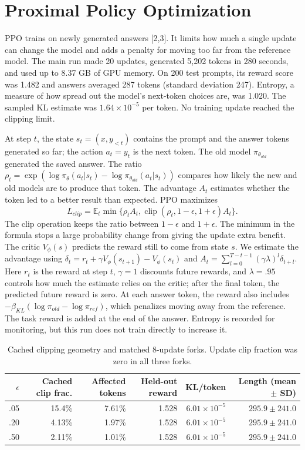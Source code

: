 \documentclass[10pt]{article}
\begin{document}
\section{Proximal Policy Optimization}
PPO trains on newly generated answers [2,3]. It limits how much a single update can change the model and adds a penalty for moving too far from the reference model. The main run made 20 updates, generated 5,202 tokens in 280 seconds, and used up to 8.37 GB of GPU memory. On 200 test prompts, its reward score was 1.482 and answers averaged 287 tokens (standard deviation 247). Entropy, a measure of how spread out the model's next-token choices are, was 1.020. The sampled KL estimate was $1.64\times10^{-5}$ per token. No training update reached the clipping limit.

At step $t$, the state $s_t=(x,y_{<t})$ contains the prompt and the answer tokens generated so far; the action $a_t=y_t$ is the next token. The old model $\pi_{\theta_{old}}$ generated the saved answer. The ratio $\rho_t=\exp(\log\pi_\theta(a_t|s_t)-\log\pi_{\theta_{old}}(a_t|s_t))$ compares how likely the new and old models are to produce that token. The advantage $A_t$ estimates whether the token led to a better result than expected. PPO maximizes
\begin{equation}
L_{clip}=\mathbb{E}_t\min\{\rho_t A_t,\operatorname{clip}(\rho_t,1-\epsilon,1+\epsilon)A_t\}.
\end{equation}
The clip operation keeps the ratio between $1-\epsilon$ and $1+\epsilon$. The minimum in the formula stops a large probability change from giving the update extra benefit. The critic $V_\phi(s)$ predicts the reward still to come from state $s$. We estimate the advantage using $\delta_t=r_t+\gamma V_\phi(s_{t+1})-V_\phi(s_t)$ and $A_t=\sum_{l=0}^{T-t-1}(\gamma\lambda)^l\delta_{t+l}$. Here $r_t$ is the reward at step $t$, $\gamma=1$ discounts future rewards, and $\lambda=.95$ controls how much the estimate relies on the critic; after the final token, the predicted future reward is zero. At each answer token, the reward also includes $-\beta_{KL}(\log\pi_{old}-\log\pi_{ref})$, which penalizes moving away from the reference. The task reward is added at the end of the answer. Entropy is recorded for monitoring, but this run does not train directly to increase it.

\begin{table}[h]
\centering\scriptsize
\caption{Cached clipping geometry and matched 8-update forks. Update clip fraction was zero in all three forks.}
\begin{tabular}{rrrrrr}
\toprule
$\epsilon$ & Cached clip frac. & Affected tokens & Held-out reward & KL/token & Length (mean $\pm$ SD) \\
\midrule
.05 & 15.4\% & 7.61\% & 1.528 & $6.01\times10^{-5}$ & $295.9\pm241.0$ \\
.20 & 4.13\% & 1.97\% & 1.528 & $6.01\times10^{-5}$ & $295.9\pm241.0$ \\
.50 & 2.11\% & 1.01\% & 1.528 & $6.01\times10^{-5}$ & $295.9\pm241.0$ \\
\bottomrule
\end{tabular}
\end{table}
\end{document}
